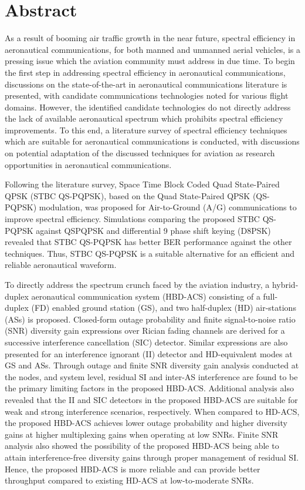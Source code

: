 \chapter* {Abstract}

As a result of booming air traffic growth in the near future, spectral efficiency in aeronautical communications, for both manned and unmanned aerial vehicles, is a pressing issue which the aviation community must address in due time. To begin the first step in addressing spectral efficiency in aeronautical communications, discussions on the state-of-the-art in aeronautical communications literature is presented, with candidate communications technologies noted for various flight domains. However, the identified candidate technologies do not directly address the lack of available aeronautical spectrum which prohibits spectral efficiency improvements. To this end, a literature survey of spectral efficiency techniques which are suitable for aeronautical communications is conducted, with discussions on potential adaptation of the discussed techniques for aviation as  research opportunities in aeronautical communications. 

Following the literature survey, Space Time Block Coded Quad State-Paired QPSK (STBC QS-PQPSK), based on the Quad State-Paired QPSK (QS-PQPSK) modulation, was proposed for Air-to-Ground (A/G) communications to improve spectral efficiency. Simulations comparing the proposed STBC QS-PQPSK against QSPQPSK and differential 9 phase shift keying (D8PSK) revealed that STBC QS-PQPSK has better BER performance against the other techniques. Thus, STBC QS-PQPSK is a suitable alternative for an efficient and reliable aeronautical waveform. 

To directly address the spectrum crunch faced by the aviation industry, a hybrid-duplex aeronautical communication system (HBD-ACS) consisting of a full-duplex (FD) enabled ground station (GS), and two half-duplex (HD) air-stations (ASs) is proposed. Closed-form outage probability and finite signal-to-noise ratio (SNR) diversity gain expressions over Rician fading channels are derived for a successive interference cancellation (SIC) detector. Similar expressions are also presented for an interference ignorant (II) detector and HD-equivalent modes at GS and ASs. Through outage and finite SNR diversity gain analysis conducted at the nodes, and system level, residual SI and inter-AS interference are found to be the primary limiting factors in the proposed HBD-ACS. Additional analysis also revealed that the II and SIC detectors in the proposed HBD-ACS are suitable for weak and strong interference scenarios, respectively. When compared to HD-ACS, the proposed HBD-ACS achieves lower outage probability and higher diversity gains at higher multiplexing gains when operating at low SNRs. Finite SNR analysis also showed the possibility of the proposed HBD-ACS being able to attain interference-free diversity gains through proper management of residual SI. Hence, the proposed HBD-ACS is more reliable and can provide better throughput compared to existing HD-ACS at low-to-moderate SNRs.


